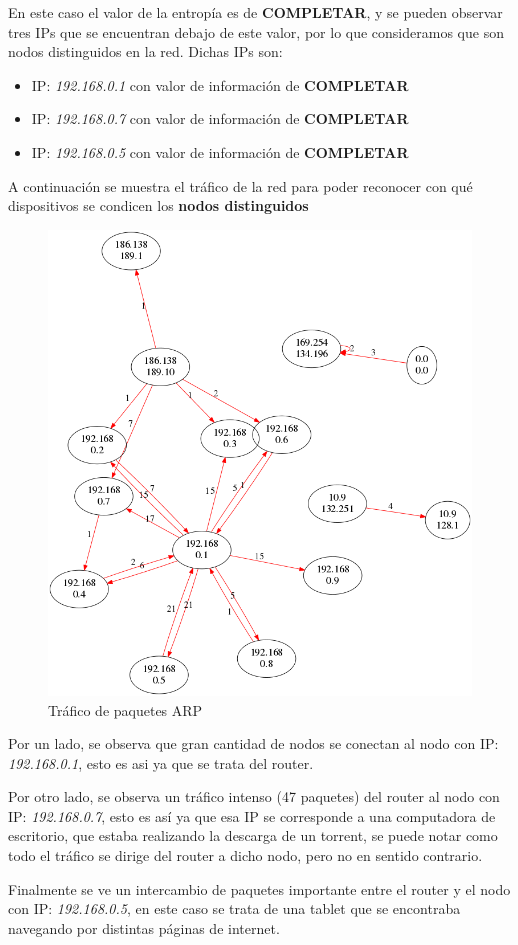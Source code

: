 En este caso el valor de la entropía es de \textbf{COMPLETAR}, y se pueden observar tres IPs que se encuentran debajo de este valor, por lo que consideramos que son nodos distinguidos en la red. Dichas IPs son:
\begin{itemize}
\item IP: \textit{192.168.0.1} con valor de información de \textbf{COMPLETAR}
\item IP: \textit{192.168.0.7} con valor de información de \textbf{COMPLETAR}
\item IP: \textit{192.168.0.5} con valor de información de \textbf{COMPLETAR}
\end{itemize}

A continuación se muestra el tráfico de la red para poder reconocer con qué dispositivos se condicen los \textbf{nodos distinguidos}

\begin{figure}[H]
       \centering
       \includegraphics[width=1\textwidth]{../resultados/Casa/network.png}
       \caption{Tráfico de paquetes ARP}
       \label{red-hogarena-arp-traffic}
\end{figure}

Por un lado, se observa que gran cantidad de nodos se conectan al nodo con IP: \textit{192.168.0.1}, esto es asi ya que se trata del router.

Por otro lado, se observa un tráfico intenso (47 paquetes) del router al nodo con IP: \textit{192.168.0.7}, esto es así ya que esa IP se corresponde a una computadora de escritorio, que estaba realizando la descarga de un torrent, se puede notar como todo el tráfico se dirige del router a dicho nodo, pero no en sentido contrario.

Finalmente se ve un intercambio de paquetes importante entre el router y el nodo con IP: \textit{192.168.0.5}, en este caso se trata de una tablet que se encontraba navegando por distintas páginas de internet.
